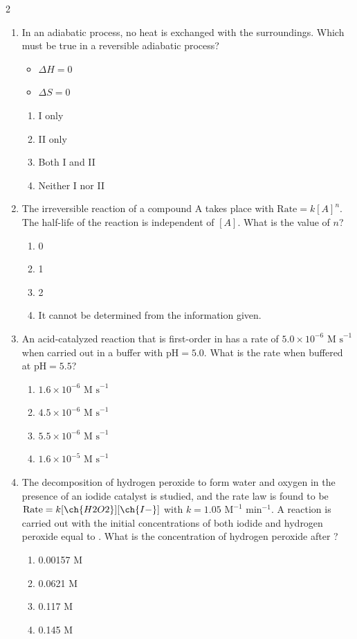 \documentclass[10pt,letterpaper]{article}
\begin{document}
\begin{multicols*}{2}
\begin{enumerate}
    \item In an adiabatic process, no heat is exchanged with the surroundings. Which must be true in a reversible adiabatic process?
    \begin{itemize}
        \item[I.] $\Delta H = 0$
        \item[II.] $\Delta S = 0$
    \end{itemize}
    \begin{enumerate}[label=(\textsubscript{\Alph*})]
        \item I only
        \item II only
        \item Both I and II
        \item Neither I nor II
    \end{enumerate}

    \item The irreversible reaction of a compound A takes place with $\text{Rate} = k[A]^n$. The half-life of the reaction is independent of $[A]$. What is the value of $n$?
    \begin{enumerate}[label=(\textsubscript{\Alph*})]
        \item 0
        \item 1
        \item 2
        \item It cannot be determined from the information given.
    \end{enumerate}

    \item An acid-catalyzed reaction that is first-order in  has a rate of $5.0 \times 10^{-6}\text{ M s}^{-1}$ when carried out in a buffer with $\text{pH} = 5.0$. What is the rate when buffered at $\text{pH} = 5.5$?
    \begin{enumerate}[label=(\textsubscript{\Alph*})]
        \item $1.6 \times 10^{-6}\text{ M s}^{-1}$
        \item $4.5 \times 10^{-6}\text{ M s}^{-1}$
        \item $5.5 \times 10^{-6}\text{ M s}^{-1}$
        \item $1.6 \times 10^{-5}\text{ M s}^{-1}$
    \end{enumerate}

    \item The decomposition of hydrogen peroxide to form water and oxygen in the presence of an iodide catalyst is studied, and the rate law is found to be $\text{Rate} = k[\ch{H2O2}][\ch{I-}]$ with $k = 1.05\text{ M}^{-1}\text{ min}^{-1}$. A reaction is carried out with the initial concentrations of both iodide and hydrogen peroxide equal to . What is the concentration of hydrogen peroxide after ?
    \begin{enumerate}[label=(\textsubscript{\Alph*})]
        \item 0.00157 M
        \item 0.0621 M
        \item 0.117 M
        \item 0.145 M
    \end{enumerate}


\end{enumerate}
\end{multicols*}
\end{document}

